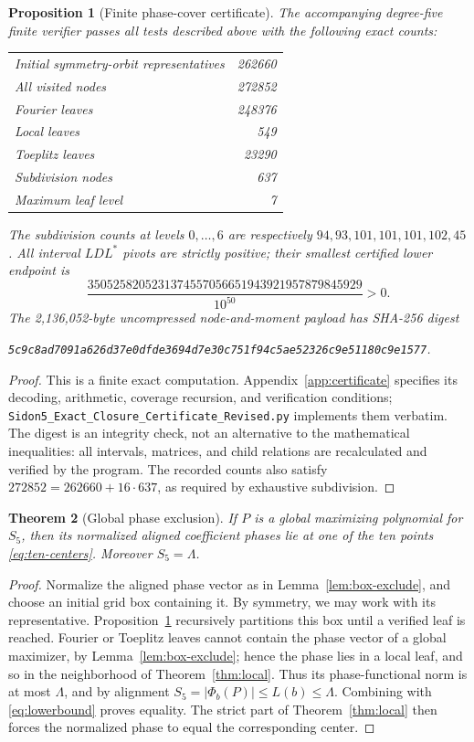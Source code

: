 \documentclass[11pt]{article}
\newtheorem{theorem}{Theorem}[section]
\newtheorem{proposition}[theorem]{Proposition}
\newcommand{\cert}{\texttt{Sidon5\_Exact\_Closure\_Certificate\_Revised.py}}
\begin{document}
\begin{proposition}[Finite phase-cover certificate]\label{prop:global-certificate}
The accompanying degree-five finite verifier passes all tests described above with the following exact counts:
\begin{center}
\begin{tabular}{lr}
\toprule
Initial symmetry-orbit representatives&262660\\
All visited nodes&272852\\
Fourier leaves&248376\\
Local leaves&549\\
Toeplitz leaves&23290\\
Subdivision nodes&637\\
Maximum leaf level&7\\\bottomrule
\end{tabular}
\end{center}
The subdivision counts at levels $0,\ldots,6$ are respectively $94,93,101,101,101,102,45$. All interval $LDL^*$ pivots are strictly positive; their smallest certified lower endpoint is
\[
 \frac{3505258205231374557056651943921957879845929}{10^{50}}>0.
\]
The 2,136,052-byte uncompressed node-and-moment payload has SHA-256 digest
\begin{center}\small\texttt{5c9c8ad7091a626d37e0dfde3694d7e30c751f94c5ae52326c9e51180c9e1577}.\end{center}
\end{proposition}
\begin{proof}
This is a finite exact computation. Appendix~\ref{app:certificate} specifies its decoding, arithmetic, coverage recursion, and verification conditions; \cert{} implements them verbatim. The digest is an integrity check, not an alternative to the mathematical inequalities: all intervals, matrices, and child relations are recalculated and verified by the program. The recorded counts also satisfy $272852=262660+16\cdot637$, as required by exhaustive subdivision.
\end{proof}

\begin{theorem}[Global phase exclusion]\label{thm:phase-global}
If $P$ is a global maximizing polynomial for $S_5$, then its normalized aligned coefficient phases lie at one of the ten points \eqref{eq:ten-centers}. Moreover $S_5=\Lambda$.
\end{theorem}
\begin{proof}
Normalize the aligned phase vector as in Lemma~\ref{lem:box-exclude}, and choose an initial grid box containing it. By symmetry, we may work with its representative. Proposition~\ref{prop:global-certificate} recursively partitions this box until a verified leaf is reached. Fourier or Toeplitz leaves cannot contain the phase vector of a global maximizer, by Lemma~\ref{lem:box-exclude}; hence the phase lies in a local leaf, and so in the neighborhood of Theorem~\ref{thm:local}. Thus its phase-functional norm is at most $\Lambda$, and by alignment
$S_5=|\Phi_b(P)|\le L(b)\le\Lambda$. Combining with \eqref{eq:lowerbound} proves equality. The strict part of Theorem~\ref{thm:local} then forces the normalized phase to equal the corresponding center.
\end{proof}
\end{document}
